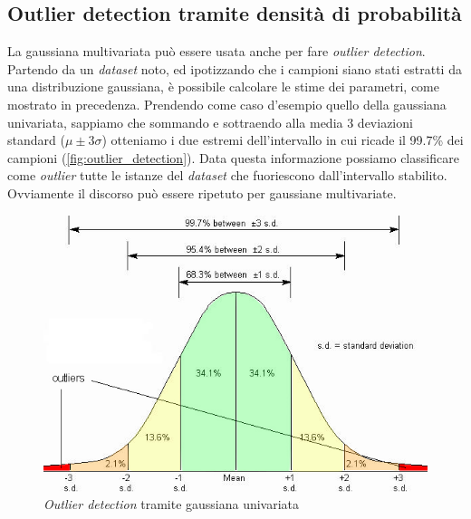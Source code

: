 \subsection{Outlier detection tramite densità di probabilità}
La gaussiana multivariata può essere usata anche per fare \emph{outlier detection}. Partendo da un \emph{dataset} noto, ed ipotizzando che i campioni siano stati estratti da una distribuzione gaussiana, è possibile calcolare le stime dei parametri, come mostrato in precedenza. Prendendo come caso d'esempio quello della gaussiana univariata, sappiamo che sommando e sottraendo alla media 3 deviazioni standard ($\mu \pm 3 \sigma$) otteniamo i due estremi dell'intervallo in cui ricade il 99.7\% dei campioni (\autoref{fig:outlier_detection}). Data questa informazione possiamo classificare come \emph{outlier} tutte le istanze del \emph{dataset} che fuoriescono dall'intervallo stabilito. Ovviamente il discorso può essere ripetuto per gaussiane multivariate.
\begin{figure}[h]
\centering
  \includegraphics[width=0.65 \textwidth]{images/outlier_detection}
  \caption{\emph{Outlier detection} tramite gaussiana univariata}
  \label{fig:outlier_detection}
\end{figure}


